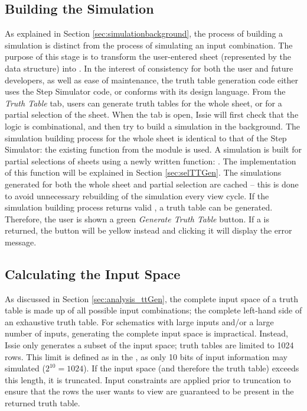 \subsection{Building the Simulation}
As explained in Section \ref{sec:simulationbackground}, the process of building a simulation is distinct from the process of simulating an input combination. The purpose of this stage is to transform the user-entered sheet (represented by the  data structure) into .
In the interest of consistency for both the user and future developers, as well as ease of maintenance, the truth table generation code either uses the Step Simulator code, or conforms with its design language.
From the \textit{Truth Table} tab, users can generate truth tables for the whole sheet, or for a partial selection of the sheet. When the tab is open, Issie will first check that the logic is combinational, and then try to build a simulation in the background. The simulation building process for the whole sheet is identical to that of the Step Simulator: the existing function  from the module  is used. A simulation is built for partial selections of sheets using a newly written function: . The implementation of this function will be explained in Section \ref{sec:selTTGen}. The simulations generated for both the whole sheet and partial selection are cached -- this is done to avoid unnecessary rebuilding of the simulation every view cycle. 
If the simulation building process returns valid , a truth table can be generated. Therefore, the user is shown a green \textit{Generate Truth Table} button. If a  is returned, the button will be yellow instead and clicking it will display the error message.

\subsection{Calculating the Input Space}
As discussed in Section \ref{sec:analysis_ttGen}, the complete input space of a truth table is made up of all possible input combinations; the complete left-hand side of an exhaustive truth table. For schematics with large inputs and/or a large number of inputs, generating the complete input space is impractical. Instead, Issie only generates a subset of the input space; truth tables are limited to 1024 rows. This limit is defined as in the , as only 10 bits of input information may simulated ($2^10 = 1024$). If the input space (and therefore the truth table) exceeds this length, it is truncated. Input constraints are applied prior to truncation to ensure that the rows the user wants to view are guaranteed to be present in the returned truth table.

